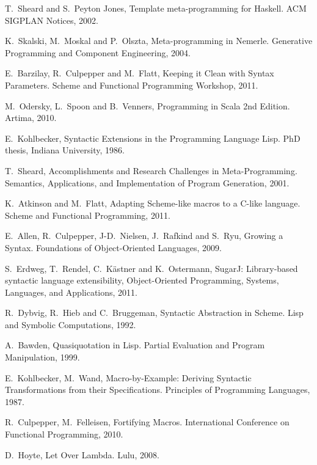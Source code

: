 \documentclass[10pt,journal,a4paper]{IEEEtran}
\begin{document}

\begin{thebibliography}{99}

T.~Sheard and S.~Peyton Jones,
Template meta-programming for Haskell.
ACM SIGPLAN Notices, 2002.

K.~Skalski, M.~Moskal and P.~Olszta,
Meta-programming in Nemerle.
Generative Programming and Component Engineering, 2004.

E.~Barzilay, R.~Culpepper and M.~Flatt,
Keeping it Clean with Syntax Parameters.
Scheme and Functional Programming Workshop, 2011.

M.~Odersky, L.~Spoon and B.~Venners,
Programming in Scala 2nd Edition.
Artima, 2010.

E.~Kohlbecker,
Syntactic Extensions in the Programming Language Lisp.
PhD thesis, Indiana University, 1986.

T.~Sheard,
Accomplishments and Research Challenges in Meta-Programming.
Semantics, Applications, and Implementation of Program Generation, 2001.

K.~Atkinson and M.~Flatt,
Adapting Scheme-like macros to a C-like language.
Scheme and Functional Programming, 2011.

E.~Allen, R.~Culpepper, J-D.~Nielsen, J.~Rafkind and S.~Ryu,
Growing a Syntax.
Foundations of Object-Oriented Languages, 2009.

S.~Erdweg, T.~Rendel, C.~K\"{a}stner and K.~Ostermann,
SugarJ: Library-based syntactic language extensibility,
Object-Oriented Programming, Systems, Languages, and Applications, 2011.

R.~Dybvig, R.~Hieb and  C.~Bruggeman,
Syntactic Abstraction in Scheme.
Lisp and Symbolic Computations, 1992.

A.~Bawden,
Quasiquotation in Lisp.
Partial Evaluation and Program Manipulation, 1999.

E.~Kohlbecker, M.~Wand,
Macro-by-Example: Deriving Syntactic Transformations from their Specifications.
Principles of Programming Languages, 1987.

R.~Culpepper, M.~Felleisen,
Fortifying Macros.
International Conference on Functional Programming, 2010.

D.~Hoyte,
Let Over Lambda.
Lulu, 2008.


\end{thebibliography}
\end{document}
